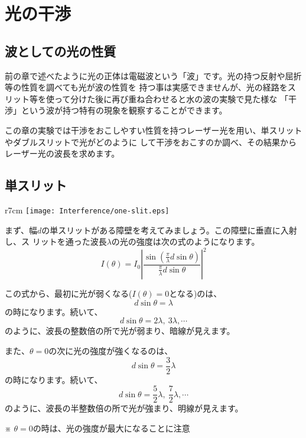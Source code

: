 %
%


\section{光の干渉}

\subsection{波としての光の性質}

前の章で述べたように光の正体は電磁波という「波」です。光の持つ反射や屈折等の性質を調べても光が波の性質を
持つ事は実感できませんが、光の経路をスリット等を使って分けた後に再び重ね合わせると水の波の実験で見た様な
「干渉」という波が持つ特有の現象を観察することができます。

この章の実験では干渉をおこしやすい性質を持つレーザー光を用い、単スリットやダブルスリットで光がどのように
して干渉をおこすのか調べ、その結果からレーザー光の波長を求めます。

\subsection{単スリット}

\begin{wrapfigure}[6]{r}{7cm}
\vspace*{-0.8cm}
\texttt{[image: Interference/one-slit.eps]}
\end{wrapfigure}


まず、幅$d$の単スリットがある障壁を考えてみましょう。この障壁に垂直に入射し、ス
リットを通った波長$\lambda$の光の強度は次の式のようになります。
\[
I(\theta)=I_0
\left|
\frac{\sin\left(\frac{\pi}{\lambda}d\sin\theta\right)}{\frac{\pi}{\lambda}d\sin\theta}
\right|^2
\]

この式から、最初に光が弱くなる($I(\theta)=0$となる)のは、
\begin{equation}
d\sin\theta=\lambda
\label{dark line}
\end{equation}
の時になります。続いて、 
\[
d\sin\theta=2\lambda,~3\lambda,\cdots
\]
のように、波長の整数倍の所で光が弱まり、暗線が見えます。

また、$\theta=0$の次に光の強度が強くなるのは、
\[
d\sin\theta=\frac{3}{2}\lambda
\]
の時になります。続いて、
\[
d\sin\theta=\frac{5}{2}\lambda,~\frac{7}{2}\lambda,\cdots
\]
のように、波長の半整数倍の所で光が強まり、明線が見えます。

\bigskip

\hspace*{-\parindent}
※ $\theta=0$の時は、光の強度が最大になることに注意


